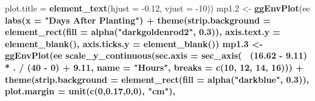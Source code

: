 \documentclass[
]{article}
\newenvironment{Shaded}{\begin{snugshade}}{\end{snugshade}}
\newcommand{\DataTypeTok}[1]{\textcolor[rgb]{0.13,0.29,0.53}{#1}}
\newcommand{\DecValTok}[1]{\textcolor[rgb]{0.00,0.00,0.81}{#1}}
\newcommand{\FloatTok}[1]{\textcolor[rgb]{0.00,0.00,0.81}{#1}}
\newcommand{\KeywordTok}[1]{\textcolor[rgb]{0.13,0.29,0.53}{\textbf{#1}}}
\newcommand{\NormalTok}[1]{#1}
\newcommand{\OperatorTok}[1]{\textcolor[rgb]{0.81,0.36,0.00}{\textbf{#1}}}
\newcommand{\StringTok}[1]{\textcolor[rgb]{0.31,0.60,0.02}{#1}}
\begin{document}
\begin{Shaded}
\begin{Highlighting}[]
{{{        \DataTypeTok{plot.title =} \KeywordTok{element_text}\NormalTok{(}\DataTypeTok{hjust =} \FloatTok{-0.12}\NormalTok{, }\DataTypeTok{vjust =} \DecValTok{-10}\NormalTok{))}
\NormalTok{mp1}\FloatTok{.2}\NormalTok{ <-}\StringTok{ }\KeywordTok{ggEnvPlot}\NormalTok{(ee }\OperatorTok{%
\StringTok{  }\KeywordTok{labs}\NormalTok{(}\DataTypeTok{x =} \StringTok{"Days After Planting"}\NormalTok{) }\OperatorTok{+}
\StringTok{  }\KeywordTok{theme}\NormalTok{(}\DataTypeTok{strip.background =} \KeywordTok{element_rect}\NormalTok{(}\DataTypeTok{fill =} \KeywordTok{alpha}\NormalTok{(}\StringTok{"darkgoldenrod2"}\NormalTok{, }\FloatTok{0.3}\NormalTok{)),}
        \DataTypeTok{axis.text.y =} \KeywordTok{element_blank}\NormalTok{(), }
        \DataTypeTok{axis.ticks.y =} \KeywordTok{element_blank}\NormalTok{())}
\NormalTok{mp1}\FloatTok{.3}\NormalTok{ <-}\StringTok{ }\KeywordTok{ggEnvPlot}\NormalTok{(ee }\OperatorTok{%
\StringTok{  }\KeywordTok{scale_y_continuous}\NormalTok{(}\DataTypeTok{sec.axis =} \KeywordTok{sec_axis}\NormalTok{(}\OperatorTok{~}\StringTok{ }\NormalTok{(}\FloatTok{16.62} \OperatorTok{-}\StringTok{ }\FloatTok{9.11}\NormalTok{) }\OperatorTok{*}\StringTok{ }\NormalTok{. }\OperatorTok{/}\StringTok{ }\NormalTok{(}\DecValTok{40} \OperatorTok{-}\StringTok{ }\DecValTok{0}\NormalTok{) }\OperatorTok{+}\StringTok{ }\FloatTok{9.11}\NormalTok{,}
                       \DataTypeTok{name =} \StringTok{"Hours"}\NormalTok{, }\DataTypeTok{breaks =} \KeywordTok{c}\NormalTok{(}\DecValTok{10}\NormalTok{, }\DecValTok{12}\NormalTok{, }\DecValTok{14}\NormalTok{, }\DecValTok{16}\NormalTok{))) }\OperatorTok{+}
\StringTok{  }\KeywordTok{theme}\NormalTok{(}\DataTypeTok{strip.background =} \KeywordTok{element_rect}\NormalTok{(}\DataTypeTok{fill =} \KeywordTok{alpha}\NormalTok{(}\StringTok{"darkblue"}\NormalTok{, }\FloatTok{0.3}\NormalTok{)),}
        \DataTypeTok{plot.margin =} \KeywordTok{unit}\NormalTok{(}\KeywordTok{c}\NormalTok{(}\DecValTok{0}\NormalTok{,}\FloatTok{0.17}\NormalTok{,}\DecValTok{0}\NormalTok{,}\DecValTok{0}\NormalTok{), }\StringTok{"cm"}\NormalTok{),}
}}}}}
\end{Highlighting}
\end{Shaded}
\end{document}
